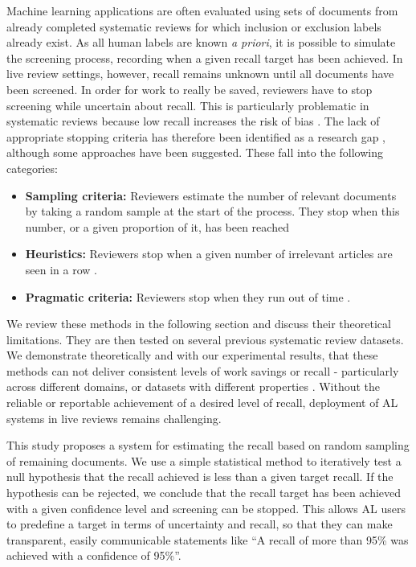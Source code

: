 \documentclass{bmcart}
\begin{document}
	Machine learning applications are often evaluated using sets of documents from already completed systematic reviews for which inclusion or exclusion labels already exist. 
	As all human labels are known \textit{a priori}, it is possible to simulate the screening process, recording when a given recall target has been achieved.
	In live review settings, however, recall remains unknown until all documents have been screened. 
	In order for work to really be saved, reviewers have to stop screening while uncertain about recall. 
	This is particularly problematic in systematic reviews because low recall increases the risk of bias \cite{Lefebvre2011}.
	The lack of appropriate stopping criteria has therefore been identified as a research gap \cite{bannach-brown2019, Marshall2019}, although some approaches have been suggested. These fall into the following categories:
	\begin{itemize}
		\item \textbf{Sampling criteria:} Reviewers estimate the number of relevant documents by taking a random sample at the start of the process. They stop when this number, or a given proportion of it, has been reached \cite{Shemilt2014}
		\item \textbf{Heuristics:} Reviewers stop when a given number of irrelevant articles are seen in a row \cite{Jonnalagadda2013, Przybya2018}. 
		\item \textbf{Pragmatic criteria:} Reviewers stop when they run out of time \cite{miwa2014}. 
	\end{itemize}
	
	We review these methods in the following section and discuss their theoretical limitations. They are then tested on several previous systematic review datasets.
	We demonstrate theoretically and with our experimental results, that these methods can not deliver consistent levels of work savings or recall - particularly across different domains, or datasets with different properties \cite{OMara-Eves2015}.  
	Without the reliable or reportable achievement of a desired level of recall, deployment of AL systems in live reviews remains challenging.
	
	This study proposes a system for estimating the recall based on random sampling of remaining documents. 
	We use a simple statistical method to iteratively test a null hypothesis that the recall achieved is less than a given target recall. If the hypothesis can be rejected, we conclude that the recall target has been achieved with a given confidence level and screening can be stopped.
	This allows AL users to predefine a target in terms of uncertainty and recall, so that they can make transparent, easily communicable statements like ``A recall of more than 95\% was achieved with a confidence of 95\%''.
	
\end{document}
